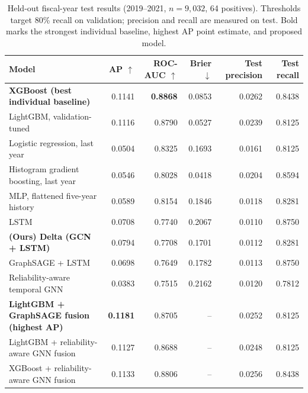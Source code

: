\begin{table}[t]
\centering
\caption{Held-out fiscal-year test results (2019--2021, $n=9{,}032$, 64 positives). Thresholds target 80\% recall on validation; precision and recall are measured on test. Bold marks the strongest individual baseline, highest AP point estimate, and proposed model.}
\label{tab:main}
\footnotesize
\begin{tabular}{lrrrrr}
\toprule
Model & AP $\uparrow$ & ROC-AUC $\uparrow$ & Brier $\downarrow$ & Test precision & Test recall \\
\midrule
\textbf{XGBoost (best individual baseline)} & 0.1141 & \textbf{0.8868} & 0.0853 & 0.0262 & 0.8438 \\
LightGBM, validation-tuned & 0.1116 & 0.8790 & 0.0527 & 0.0239 & 0.8125 \\
Logistic regression, last year & 0.0504 & 0.8325 & 0.1693 & 0.0161 & 0.8125 \\
Histogram gradient boosting, last year & 0.0546 & 0.8028 & 0.0418 & 0.0204 & 0.8594 \\
MLP, flattened five-year history & 0.0589 & 0.8154 & 0.1846 & 0.0118 & 0.8281 \\
LSTM & 0.0708 & 0.7740 & 0.2067 & 0.0110 & 0.8750 \\
\textbf{(Ours) Delta (GCN + LSTM)} & 0.0794 & 0.7708 & 0.1701 & 0.0112 & 0.8281 \\
GraphSAGE + LSTM & 0.0698 & 0.7649 & 0.1782 & 0.0113 & 0.8750 \\
Reliability-aware temporal GNN & 0.0383 & 0.7515 & 0.2162 & 0.0120 & 0.7812 \\
\textbf{LightGBM + GraphSAGE fusion (highest AP)} & \textbf{0.1181} & 0.8705 & -- & 0.0252 & 0.8125 \\
LightGBM + reliability-aware GNN fusion & 0.1127 & 0.8688 & -- & 0.0248 & 0.8125 \\
XGBoost + reliability-aware GNN fusion & 0.1133 & 0.8806 & -- & 0.0256 & 0.8438 \\
\bottomrule
\end{tabular}
\end{table}
